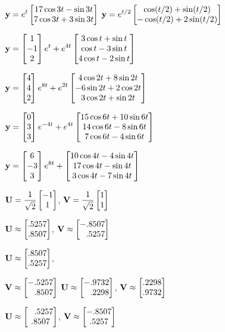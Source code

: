 \smallskip
{}
$\displaystyle{\mathbf{y}=e^t\begin{bmatrix}17\cos3t-\sin3t\\7\cos3t+3\sin3t
\end{bmatrix}}$
$\mathbf{y}=\displaystyle{e^{t/2}\begin{bmatrix}\cos(t/2)+\sin(t/2)\\
-\cos(t/2)+2\sin(t/2)\end{bmatrix}}$

\smallskip
{}
$\displaystyle{\mathbf{y}=\begin{bmatrix}1\\-1\\2\end{bmatrix}e^t
+e^{4t}\begin{bmatrix}
3\cos t+\sin t\\\cos t-3\sin t\\4\cos t-2\sin t\end{bmatrix}}$

\smallskip
{}
$\displaystyle{\mathbf{y}=\begin{bmatrix}4\\4\\2\end{bmatrix}e^{8t}
+e^{2t}\begin{bmatrix}
4\cos2t+8\sin2t\\-6\sin2t+2\cos2t\\3\cos2t+\sin2t\end{bmatrix}}$

\smallskip
{}
$\displaystyle{\mathbf{y}=\begin{bmatrix}0\\3\\3\end{bmatrix}e^{-4t}
+e^{4t}\begin{bmatrix}
15\cos6t+10\sin6t\\14\cos6t-8\sin6t\\7\cos6t-4\sin6 t\end{bmatrix}}$

\smallskip
{}
$\displaystyle{\mathbf{y}=\begin{bmatrix}6\\-3\\3\end{bmatrix}e^{8t}
+\begin{bmatrix}10\cos4t-4\sin4t\\17\cos4t-\sin4t\\3\cos4t-7\sin4t
\end{bmatrix}}$

\smallskip
{}
 $\mathbf{U}=\displaystyle{\frac{1}{\sqrt2}\begin{bmatrix}-1\\1\end{bmatrix}}$,
$\mathbf{V}=\displaystyle{\frac{1}{\sqrt2}\begin{bmatrix}1\\1\end{bmatrix}}$\;

 $\mathbf{U}\approx\displaystyle{\begin{bmatrix}.5257\\.8507\end{bmatrix}}$,
$\mathbf{V}\approx\displaystyle{\begin{bmatrix}-.8507\\\phantom{-}.5257\end{bmatrix}}$


\smallskip
{}
 $\mathbf{U}\approx\displaystyle{\begin{bmatrix}.8507\\.5257\end{bmatrix}}$,

$\mathbf{V}\approx\displaystyle{\begin{bmatrix}-.5257\\\phantom{-}.8507\end{bmatrix}}$\quad
{}
 $\mathbf{U}\approx\displaystyle{\begin{bmatrix}-.9732\\\phantom{-}.2298\end{bmatrix}}$,
$\mathbf{V}\approx\displaystyle{\begin{bmatrix}.2298\\.9732\end{bmatrix}}$

\smallskip
{}
 $\mathbf{U}\approx\displaystyle{\begin{bmatrix}\phantom{-}.5257\\.8507\end{bmatrix}}$,
$\mathbf{V}\approx\displaystyle{\begin{bmatrix}-.8507\\.5257\end{bmatrix}}$\,

